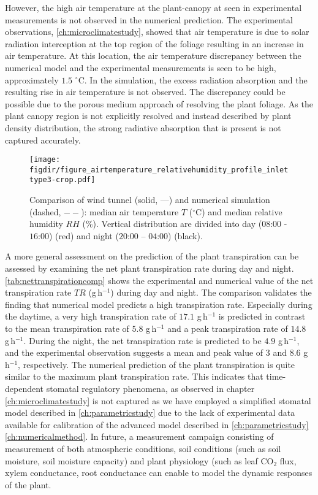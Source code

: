 However, the high air temperature at the plant-canopy at seen in experimental measurements is not observed in the numerical prediction. The experimental observations, \cref{ch:microclimatestudy}, showed that air temperature is due to solar radiation interception at the top region of the foliage resulting in an increase in air temperature. At this location, the air temperature discrepancy between the numerical model and the experimental measurements is seen to be high, approximately $1.5$ $^{\circ}$C. In the simulation, the excess radiation absorption and the resulting rise in air temperature is not observed. The discrepancy could be possible due to the porous medium approach of resolving the plant foliage. As the plant canopy region is not explicitly resolved and instead described by plant density distribution, the strong radiative absorption that is present is not captured accurately. 

\begin{figure}[t]
	\centering
	\texttt{[image: \\figdir/figure\_airtemperature\_relativehumidity\_profile\_inlettype3-crop.pdf]}
	\caption{Comparison of wind tunnel (solid, ---) and numerical simulation (dashed, $--$):  median air temperature $T$ ($^{\circ}$C) and  median relative humidity $\mathit{RH}$ (\%). Vertical distribution are divided into day ($08$:$00$ - $16$:$00$) (red) and night ($20$:$00$ – $04$:$00$) (black).}
	\label{fig:figure_airtemperature_relativehumidity_profile2}
\end{figure}

A more general assessment on the prediction of the plant transpiration can be assessed by examining the net plant transpiration rate during day and night. \cref{tab:nettranspirationcomp} shows the experimental and numerical value of the net transpiration rate $\textit{TR}$ (g\,h$^{-1}$) during day and night. The comparison validates the finding that numerical model predicts a high transpiration rate. Especially during the daytime, a very high transpiration rate of $17.1$ g\,h$^{-1}$ is predicted in contrast to the mean transpiration rate of $5.8$ g\,h$^{-1}$ and a peak transpiration rate of $14.8$ g\,h$^{-1}$. During the night, the net transpiration rate is predicted to be $4.9$ g\,h$^{-1}$, and the experimental observation suggests a mean and peak value of $3$ and $8.6$ g\,h$^{-1}$, respectively. The numerical prediction of the plant transpiration is quite similar to the maximum plant transpiration rate. This indicates that time-dependent stomatal regulatory phenomena, as observed in chapter \ref{ch:microclimatestudy} is not captured as we have employed a simplified stomatal model described in \cref{ch:parametricstudy} due to the lack of experimental data available for calibration of the advanced model described in \cref{ch:parametricstudy} \cref{ch:numericalmethod}. In future, a measurement campaign consisting of measurement of both atmospheric conditions, soil conditions (such as soil moisture, soil moisture capacity) and plant physiology (such as leaf CO$_2$ flux, xylem conductance, root conductance can enable to model the dynamic responses of the plant.

